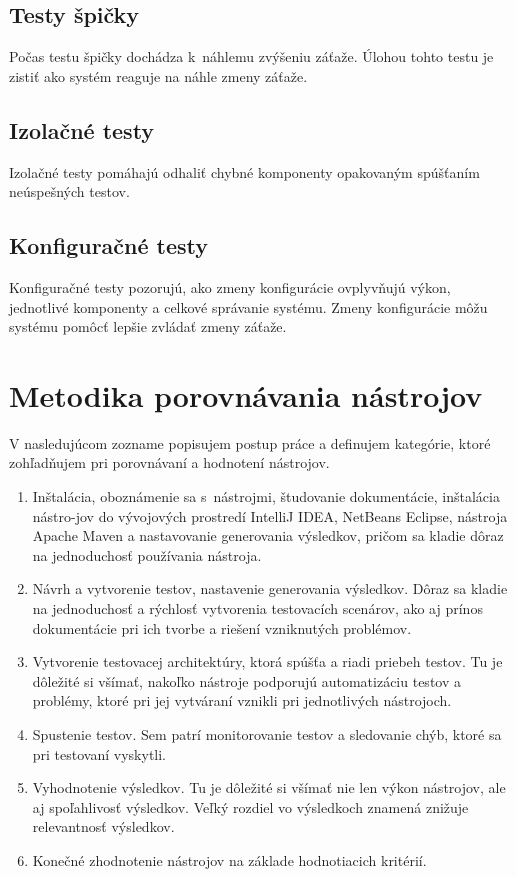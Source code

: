 \documentclass[12pt,oneside,final]{fithesis-utf8}
\begin{document}
\section{Testy špičky}
Počas testu špičky dochádza k~náhlemu zvýšeniu záťaže. Úlohou tohto testu je zistiť ako systém reaguje na náhle zmeny záťaže.

\section{Izolačné testy}
Izolačné testy pomáhajú odhaliť chybné komponenty opakovaným spúšťaním neúspešných testov.

\section{Konfiguračné testy}
Konfiguračné testy pozorujú, ako zmeny konfigurácie ovplyvňujú výkon, jednotlivé komponenty a celkové správanie systému. Zmeny konfigurácie môžu systému pomôcť lepšie zvládať zmeny záťaže\cite{IntegratedApproach}.



\chapter{Metodika porovnávania nástrojov}

V nasledujúcom zozname popisujem postup práce a definujem kategórie, ktoré zohľadňujem pri porovnávaní a hodnotení nástrojov.

\begin{enumerate}

\item Inštalácia, oboznámenie sa s~nástrojmi, študovanie dokumentácie, inštalácia nástro-jov do vývojových prostredí IntelliJ IDEA, NetBeans Eclipse, nástroja Apache Maven a nastavovanie generovania výsledkov, pričom sa kladie dôraz na jednoduchosť používania nástroja.

\item Návrh a vytvorenie testov, nastavenie generovania výsledkov. Dôraz sa kladie na jednoduchosť a rýchlosť vytvorenia testovacích scenárov, ako aj prínos dokumentácie pri ich tvorbe a riešení vzniknutých problémov.

\item Vytvorenie testovacej architektúry, ktorá spúšťa a riadi priebeh testov. Tu je dôležité si všímať, nakoľko nástroje podporujú automatizáciu testov a problémy, ktoré pri jej vytváraní vznikli pri jednotlivých nástrojoch.

\item Spustenie testov. Sem patrí monitorovanie testov a sledovanie chýb, ktoré sa pri testovaní vyskytli. 

\item Vyhodnotenie výsledkov. Tu je dôležité si všímať nie len výkon nástrojov, ale aj spoľahlivosť výsledkov. Veľký rozdiel vo výsledkoch znamená znižuje relevantnosť výsledkov.

\item Konečné zhodnotenie nástrojov na základe hodnotiacich kritérií.

\end{enumerate}
\end{document}
